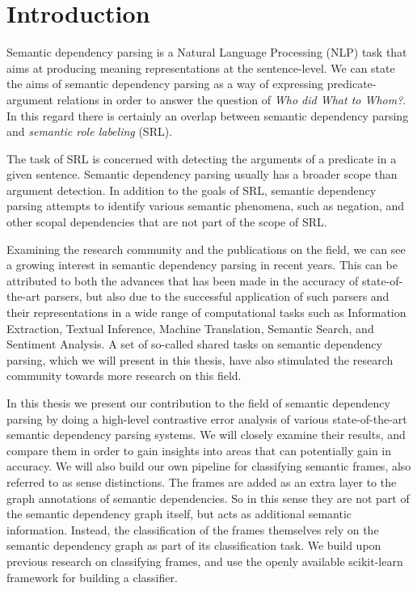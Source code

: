 \chapter{Introduction}
\label{chap:introduction}

Semantic dependency parsing is a Natural Language Processing (NLP) task that aims at producing meaning representations at the sentence-level. We can state the aims of semantic dependency parsing as a way of expressing predicate-argument relations in order to answer the question of \textit{Who did What to Whom?}. In this regard there is certainly an overlap between semantic dependency parsing  and \textit{semantic role labeling} (SRL). 

The task of SRL is concerned with detecting the arguments of a predicate in a given sentence. Semantic dependency parsing usually has a broader scope than argument detection. In addition to the goals of SRL, semantic dependency parsing attempts to identify various semantic phenomena, such as negation, and other scopal dependencies that are not part of the scope of SRL.

Examining the research community and the publications on the field, we can see a growing interest in semantic dependency parsing in recent years. This can be attributed to both the advances that has been made in the accuracy of state-of-the-art parsers, but also due to the successful application of such parsers and their representations in a wide range of computational tasks such as Information Extraction, Textual Inference, Machine Translation, Semantic Search, and Sentiment Analysis. A set of so-called shared tasks on semantic dependency parsing, which we will present in this thesis, have also stimulated the research community towards more research on this field.

In this thesis we present our contribution to the field of semantic dependency parsing by doing a high-level contrastive error analysis of various state-of-the-art semantic dependency parsing systems. We will closely examine their results, and compare them in order to gain insights into areas that can potentially gain in accuracy. We will also build our own pipeline for classifying semantic frames, also referred to as sense distinctions. The frames are added as an extra layer to the graph annotations of semantic dependencies. So in this sense they are not part of the semantic dependency graph itself, but acts as additional semantic information. Instead, the classification of the frames themselves rely on the semantic dependency graph as part of its classification task. We build upon previous research on classifying frames, and use the openly available scikit-learn framework for building a classifier. 

